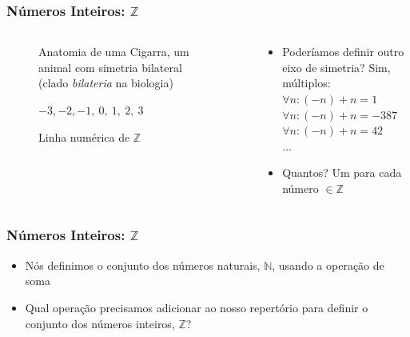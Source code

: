 \documentclass[usenames,dvipsnames,svgnames]{beamer}
\begin{document}
\begin{frame}	
	\frametitle{Números Inteiros: $\mathbb{Z}$}

	\begin{columns}[t]
	\begin{column}{.3\textwidth}
		\begin{figure}
			\caption{\small Anatomia de uma Cigarra, um animal com simetria bilateral (clado \emph{bilateria} na biologia)}
		\end{figure}
		\begin{figure}
			\small $-3, -2, -1, ~0, ~1, ~2, ~3$
			\caption{\small Linha numérica de $\mathbb{Z}$}
		\end{figure}
	\end{column}
	\begin{column}{.7\textwidth}
		\begin{itemize}
		\item Poderíamos definir outro eixo de simetria? Sim, múltiplos: \\ $\forall n: (-n) + n = 1$ \\ $\forall n: (-n) + n = -387$ \\ $\forall n: (-n) + n = 42$ \\ $\dots$
		\item Quantos? Um para cada número $\in \mathbb{Z}$
		\end{itemize}
	\end{column}
	\end{columns}
\end{frame}

\begin{frame}	
	\frametitle{Números Inteiros: $\mathbb{Z}$}

	\begin{itemize}
		\item Nós definimos o conjunto dos números naturais, $\mathbb{N}$, usando a operação de soma
		\item Qual operação precisamos adicionar ao nosso repertório para definir o conjunto dos números inteiros, $\mathbb{Z}$?
 	\end{itemize}
\end{frame}
\end{document}
